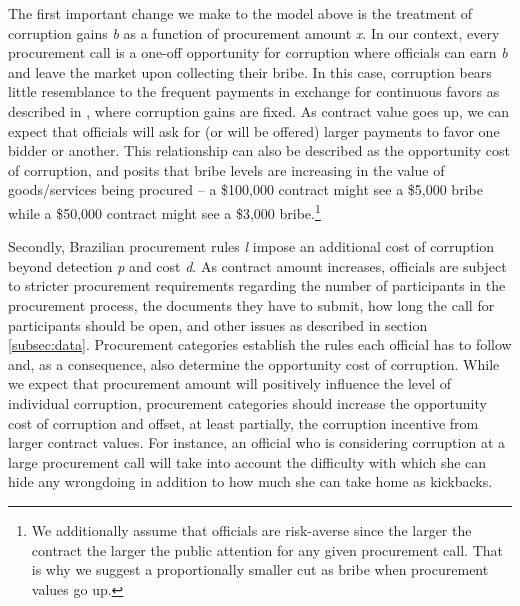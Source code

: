 \documentclass[11pt]{article}
\begin{document}
The first important change we make to the \citet{OlkenCorruptionDevelopingCountries2012b} model above is the treatment of corruption gains \emph{b} as a function of procurement amount \emph{x}. In our context, every procurement call is a one-off opportunity for corruption where officials can earn \emph{b} and leave the market upon collecting their bribe. In this case, corruption bears little resemblance to the frequent payments in exchange for continuous favors as described in \citet{OlkenCorruptionDevelopingCountries2012b}, where corruption gains are fixed. As contract value goes up, we can expect that officials will ask for (or will be offered) larger payments to favor one bidder or another. This relationship can also be described as the opportunity cost of corruption, and posits that bribe levels are increasing in the value of goods/services being procured -- a \$100,000 contract might see a \$5,000 bribe while a \$50,000 contract might see a \$3,000 bribe.\footnote{We additionally assume that officials are risk-averse since the larger the contract the larger the public attention for any given procurement call. That is why we suggest a proportionally smaller cut as bribe when procurement values go up.}

Secondly, Brazilian procurement rules \emph{l} impose an additional cost of corruption beyond detection \emph{p} and cost \emph{d}. As contract amount increases, officials are subject to stricter procurement requirements regarding the number of participants in the procurement process, the documents they have to submit, how long the call for participants should be open, and other issues as described in section \ref{subsec:data}. Procurement categories establish the rules each official has to follow and, as a consequence, also determine the opportunity cost of corruption. While we expect that procurement amount will positively influence the level of individual corruption, procurement categories should increase the opportunity cost of corruption and offset, at least partially, the corruption incentive from larger contract values. For instance, an official who is considering corruption at a large procurement call will take into account the difficulty with which she can hide any wrongdoing in addition to how much she can take home as kickbacks.
\end{document}
